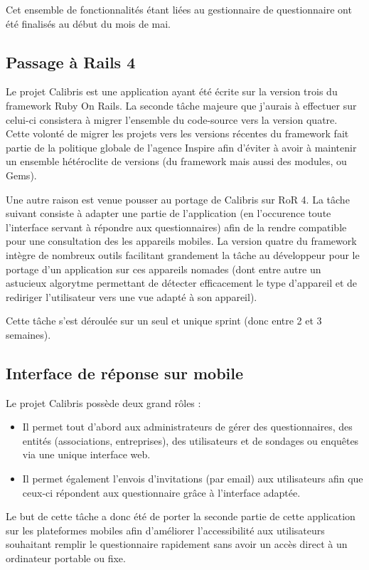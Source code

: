\documentclass[12pt,a4paper]{book}
\begin{document}
Cet ensemble de fonctionnalités étant liées au gestionnaire de questionnaire ont été finalisés au début du mois de mai.

\subsection{Passage à Rails 4}

Le projet Calibris est une application ayant été écrite sur la version trois du framework Ruby On Rails. La seconde tâche majeure que j'aurais à effectuer sur celui-ci consistera à migrer l'ensemble du code-source vers la version quatre. Cette volonté de migrer les projets vers les versions récentes du framework fait partie de la politique globale de l'agence Inspire afin d'éviter à avoir à maintenir un ensemble hétéroclite de versions (du framework mais aussi des modules, ou Gems).

Une autre raison est venue pousser au portage de Calibris sur RoR 4. La tâche suivant consiste à adapter une partie de l'application (en l'occurence toute l'interface servant à répondre aux questionnaires) afin de la rendre compatible pour une consultation des les appareils mobiles. La version quatre du framework intègre de nombreux outils facilitant grandement la tâche au développeur pour le portage d'un application sur ces appareils nomades (dont entre autre un astucieux algorytme permettant de détecter efficacement le type d'appareil et de rediriger l'utilisateur vers une vue adapté à son appareil).

Cette tâche s'est déroulée sur un seul et unique sprint (donc entre 2 et 3 semaines).

\subsection{Interface de réponse sur mobile}

Le projet Calibris possède deux grand rôles :
\begin{itemize}
  \item Il permet tout d'abord aux administrateurs de gérer des questionnaires, des entités (associations, entreprises), des utilisateurs et de sondages ou enquêtes via une unique interface web.
  \item Il permet également l'envois d'invitations (par email) aux utilisateurs afin que ceux-ci répondent aux questionnaire grâce à l'interface adaptée.  
\end{itemize}

Le but de cette tâche a donc été de porter la seconde partie de cette application sur les plateformes mobiles afin d'améliorer l'accessibilité aux utilisateurs souhaitant remplir le questionnaire rapidement sans avoir un accès direct à un ordinateur portable ou fixe.
\end{document}
